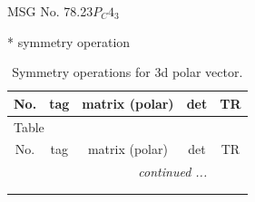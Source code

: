 \documentclass[fleqn,8pt]{jsarticle}
\begin{document}
\setcounter{MaxMatrixCols}{32}

\renewcommand{\tablename}{Table~}
\renewcommand{\figurename}{Figure~}
\begin{center}
\LARGE
MSG No. 78.23\quad$P_{C}4_{3}$
\end{center}
* symmetry operation
\renewcommand{\arraystretch}{1.3}
\begin{longtable}{ccccc}
\caption{Symmetry operations for 3d polar vector.}
 \\
 \hline \hline
No. & tag & matrix (polar) & det & TR \\ \hline \endfirsthead

\multicolumn{4}{l}{\tablename\ \thetable{}} \\
 \hline \hline
No. & tag & matrix (polar) & det & TR \\ \hline \endhead

 \hline \hline
\multicolumn{4}{r}{\footnotesize\it continued ...} \\ \endfoot

 \hline \hline
\multicolumn{4}{r}{} \\ \endlastfoot


\end{longtable}
\end{document}

